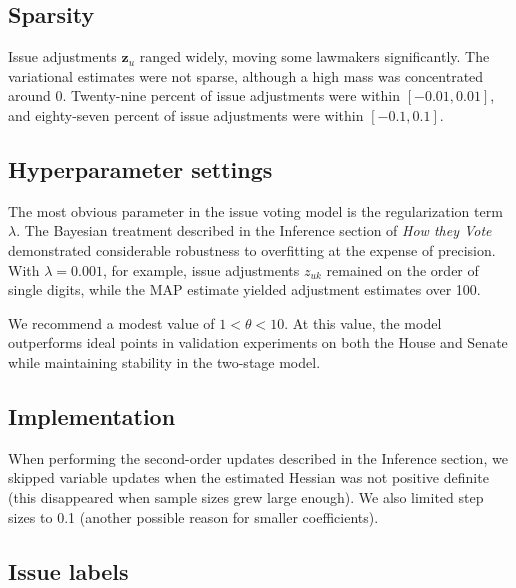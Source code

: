 \subsection{Sparsity}
Issue adjustments $\bm z_u$ ranged widely, moving some lawmakers
significantly. The variational estimates were not sparse, although a
high mass was concentrated around 0. Twenty-nine percent of issue
adjustments were within $[-0.01, 0.01]$, and eighty-seven percent of
issue adjustments were within $[-0.1, 0.1]$.

\subsection{Hyperparameter settings}
The most obvious parameter in the issue voting model is the
regularization term $\lambda$. The Bayesian treatment described in
the Inference section of \emph{How they Vote} demonstrated considerable robustness
to overfitting at the expense of precision.  With $\lambda=0.001$,
for example, issue adjustments $z_{uk}$ remained on the order of single digits,
while the MAP estimate yielded adjustment estimates over 100.

We recommend a modest value of $1 < \theta < 10$.  At this value, the model
outperforms ideal points in validation experiments on both the House
and Senate while maintaining stability in the two-stage model.

\subsection{Implementation}

When performing the second-order updates described in
the Inference section, we skipped variable updates when the
estimated Hessian was not positive definite (this disappeared when
sample sizes grew large enough).  We also limited step sizes to 0.1
(another possible reason for smaller coefficients).

\subsection{Issue labels}
\label{sec:issue_labels}

